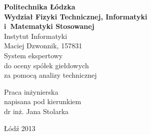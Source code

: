 \begin{titlepage}
\begin{center}
\textbf{{\large Politechnika Łódzka}\\}
\vspace{\medskipamount}
\textbf{\large Wydział Fizyki Technicznej, Informatyki\\i~Matematyki Stosowanej}
\vspace{\medskipamount}\\
{\large Instytut Informatyki}\\
\vspace{2.5cm}
{\Large {Maciej Dzwonnik, 157831\\}}
\vspace{2cm}
{\huge{ {System ekspertowy \\do oceny spółek giełdowych \\za pomocą analizy technicznej\\}}}
\end{center}
\vspace{3cm}
\hfill
\begin{minipage}{.55\columnwidth}
Praca {inżynierska}\\
napisana pod kierunkiem\\
dr inż. Jana Stolarka
\end{minipage}
\vfill
\begin{center}
Łódź {2013}
\end{center}
\end{titlepage}
